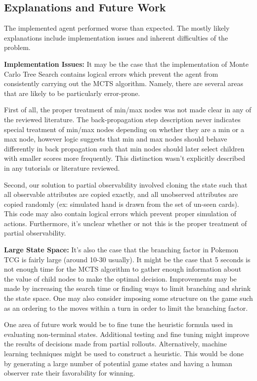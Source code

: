 \documentclass{article}
\begin{document}
\subsection{Explanations and Future Work} %
The implemented agent performed worse than expected. The mostly likely explanations include implementation issues and inherent difficulties of the problem. 

\textbf{Implementation Issues: } It may be the case that the implementation of Monte Carlo Tree Search contains logical errors which prevent the agent from consistently carrying out the MCTS algorithm. Namely, there are several areas that are likely to be particularly error-prone. 

First of all, the proper treatment of min/max nodes was not made clear in any of the reviewed literature. The back-propagation step description never indicates special treatment of min/max nodes depending on whether they are a min or a max node, however logic suggests that min and max nodes should behave differently in back propagation such that min nodes should later select children with smaller scores more frequently. This distinction wasn't explicitly described in any tutorials or literature reviewed. 

Second, our solution to partial observability involved cloning the state such that all observable attributes are copied exactly, and all unobserved attributes are copied randomly (ex: simulated hand is drawn from the set of un-seen cards). This code may also contain logical errors which prevent proper simulation of actions. Furthermore, it's unclear whether or not this is the proper treatment of partial observability. 

\textbf{Large State Space: } It's also the case that the branching factor in Pokemon TCG is fairly large (around 10-30 usually). It might be the case that 5 seconds is not enough time for the MCTS algorithm to gather enough information about the value of child nodes to make the optimal decision. Improvements may be made by increasing the search time or finding ways to limit branching and shrink the state space. One may also consider imposing some structure on the game such as an ordering to the moves within a turn in order to limit the branching factor.


One area of future work would be to fine tune the heuristic formula used in evaluating non-terminal states.  Additional testing and fine tuning might improve the results of decisions made from partial rollouts.  Alternatively, machine learning techniques might be used to construct a heuristic.  This would be done by generating a large number of potential game states and having a human observer rate their favorability for winning.
\end{document}
